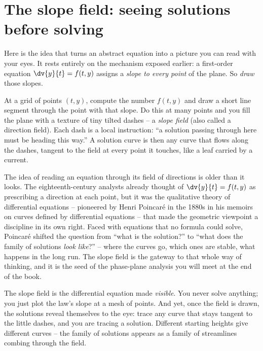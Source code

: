 \section{The slope field: seeing solutions before solving}
\label{ch36:sec-slopefield}

Here is the idea that turns an abstract equation into a picture you can read with your eyes. It rests entirely on the mechanism exposed earlier: a first-order equation $\dv{y}{t} = f(t,y)$ assigns a \emph{slope to every point} of the plane. So \emph{draw} those slopes.

At a grid of points $(t,y)$, compute the number $f(t,y)$ and draw a short line segment through the point with that slope. Do this at many points and you fill the plane with a texture of tiny tilted dashes -- a \emph{slope field} (also called a direction field). Each dash is a local instruction: ``a solution passing through here must be heading this way.'' A solution curve is then any curve that flows along the dashes, tangent to the field at every point it touches, like a leaf carried by a current.

\begin{historybox}
The idea of reading an equation through its field of directions is older than it looks. The eighteenth-century analysts already thought of $\dv{y}{t}=f(t,y)$ as prescribing a direction at each point, but it was the qualitative theory of differential equations -- pioneered by Henri Poincar\'e in the 1880s in his memoirs on curves defined by differential equations -- that made the geometric viewpoint a discipline in its own right. Faced with equations that no formula could solve, Poincar\'e shifted the question from ``what is the solution?'' to ``what does the family of solutions \emph{look like}?'' -- where the curves go, which ones are stable, what happens in the long run. The slope field is the gateway to that whole way of thinking, and it is the seed of the phase-plane analysis you will meet at the end of the book.
\end{historybox}

\begin{intuitionbox}
The slope field is the differential equation made \emph{visible}. You never solve anything; you just plot the law's slope at a mesh of points. And yet, once the field is drawn, the solutions reveal themselves to the eye: trace any curve that stays tangent to the little dashes, and you are tracing a solution. Different starting heights give different curves -- the family of solutions appears as a family of streamlines combing through the field.
\end{intuitionbox}

